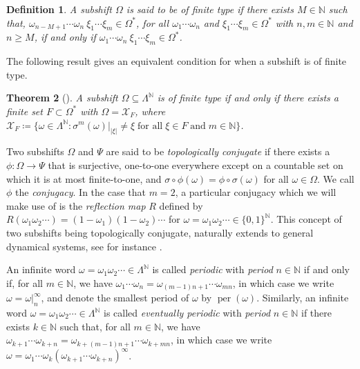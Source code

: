 \documentclass[a4paper,reqno,10pt]{amsart}
\newtheorem{theorem}{Theorem}[section]
\newtheorem{definition}[theorem]{Definition}
\begin{document}
    \begin{definition}
        A subshift $\Omega$ is said to be \textsl{of finite type} if there exists $M \in \mathbb{N}$ such that, $\omega_{n - M + 1} \cdots \omega_{n} \ \xi_{1} \cdots \xi_{m} \in \Omega^{*}$, for all $\omega_{1} \cdots \omega_{n}$ and $\xi_{1} \cdots \xi_{m} \in \Omega^{*}$ with $n, m \in \mathbb{N}$ and $n \geq M$, if and only if $\omega_{1} \cdots \omega_{n} \ \xi_{1} \cdots \xi_{m} \in \Omega^{*}$. 
    \end{definition}
 
The following result gives an equivalent condition for when a subshift is of finite type.

    \begin{theorem}[{\cite[Theorem 2.1.8]{LM}}]
        A subshift $\Omega \subseteq \Lambda^{\mathbb{N}}$ is of finite type if and only if there exists a finite set $F \subset \Omega^{*}$ with $\Omega = \mathcal{X}_{F}$, where $\mathcal{X}_{F} \coloneqq \{ \omega \in \Lambda^{\mathbb{N}} \colon \sigma^{m}(\omega)\vert_{\lvert \xi \rvert} \neq \xi \; \text{for all} \; \xi \in F \; \text{and} \; m \in \mathbb{N}\}$.
    \end{theorem}
 
Two subshifts $\Omega$ and $\Psi$ are said to be \textsl{topologically conjugate} if there exists a $\phi \colon \Omega \to \Psi$ that is surjective, one-to-one everywhere except on a countable set on which it is at most finite-to-one, and $\sigma \circ \phi(\omega) = \phi \circ \sigma(\omega)$ for all $\omega \in \Omega$.  We call $\phi$ the \textsl{conjugacy}. In the case that $m = 2$, a particular conjugacy which we will make use of is the \textsl{reflection map} $R$ defined by $R(\omega_{1} \omega_{2} \cdots) = (1-\omega_{1})(1-\omega_{2})\cdots$ for $\omega = \omega_{1} \omega_{2} \cdots \in \{0,1\}^{\mathbb{N}}$. This concept of two subshifts being topologically conjugate, naturally extends to general dynamical systems, see for instance \cite{LM,brin_stuck_2002}.

An infinite word $\omega = \omega_{1} \omega_{2} \cdots \in \Lambda^{\mathbb{N}}$ is called \textsl{periodic} with \textsl{period} $n \in \mathbb{N}$ if and only if, for all $m \in \mathbb{N}$, we have $\omega_{1} \cdots \omega_{n} = \omega_{(m - 1)n + 1} \cdots \omega_{m n}$, in which case we write $\omega = \omega\vert_{n}^{\infty}$, and denote the smallest period of $\omega$ by $\operatorname{per}(\omega)$.  Similarly, an infinite word $\omega = \omega_{1} \omega_{2} \cdots \in \Lambda^{\mathbb{N}}$ is called \textsl{eventually periodic} with \textsl{period} $n \in \mathbb{N}$ if there exists $k \in \mathbb{N}$ such that, for all $m \in \mathbb{N}$, we have $\omega_{k+1} \cdots \omega_{k+n} = \omega_{k+(m - 1)n + 1} \cdots \omega_{k+ m n}$, in which case we write $\omega = \omega_{1} \cdots \omega_{k} (\omega_{k+1} \cdots \omega_{k+n})^\infty$.
\end{document}
